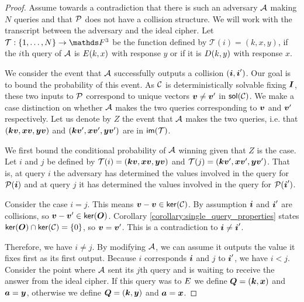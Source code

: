 \begin{proof}
    Assume towards a contradiction that there is such an adversary $\A$ making $N$ queries
    and that $\P$ does not have a collision structure.
    We will work with the transcript between the adversary and the ideal cipher.
    Let $\mathcal{T}: \{1, \dots, N\} \to \F^3$ be the function defined by $\mathcal{T}(i) = (k, x, y)$,
    if the $i$th query of $\A$ is $\E(k, x)$ with response $y$ or if it is $\D(k, y)$ with response $x$.

    We consider the event that $\A$ successfully outputs a collision $(\vi, \vi')$.
    Our goal is to bound the probability of this event.
    As $\C$ is deterministically solvable fixing $\I$, these two inputs to $\P$ correspond to unique vectors $\vv \neq \vv'$ in $\sol(\C)$.
    We make a case distinction on whether $\A$ makes the two queries corresponding to $\vv$ and $\vv'$ respectively.
    Let us denote by $Z$ the event that $\A$ makes the two queries, i.e. that $(\vk \vv, \vx \vv, \vy \vv)$ and $(\vk \vv', \vx \vv', \vy \vv')$ are in $\im(\mathcal{T})$.
    
    We first bound the conditional probability of $\A$ winning given that $Z$ is the case.
    Let $i$ and $j$ be defined by $\mathcal{T}(i) = (\vk \vv, \vx \vv, \vy \vv)$
    and $\mathcal{T}(j) = (\vk \vv', \vx \vv', \vy \vv')$. 
    That is, at query $i$ the adversary has determined the values involved in the query for $\P(\v i)$ and
    at query $j$ it has determined the values involved in the query for $\P(\v i')$.
    
    Consider the case $i = j$.
    This means $\vv - \vv \in \ker(\C)$.
    By assumption $\v i$ and $\v i'$ are collisions, so $\vv - \vv' \in \ker(\O)$.
    Corollary \ref{corollary:single_query_properties} states $\ker(\O) \cap \ker(\C) = \{0\}$,
    so $\vv = \vv'$. 
    This is a contradiction to $\v i \neq \v i'$.
    
    Therefore, we have $i \neq j$.
    By modifying $\A$,
    we can assume it outputs the value it fixes first as its first output.
    Because $i$ corresponds $\vi$ and $j$ to $\vi'$, we have $i < j$.
    Consider the point where $\A$ sent its $j$th query and is waiting to receive the answer from the ideal cipher.
    If this query was to $\E$ we define $\Q = (\vk, \vx)$ and $\va = \vy$,
    otherwise we define $\Q = (\vk, \vy)$ and $\va = \vx$.
    

\end{proof}

